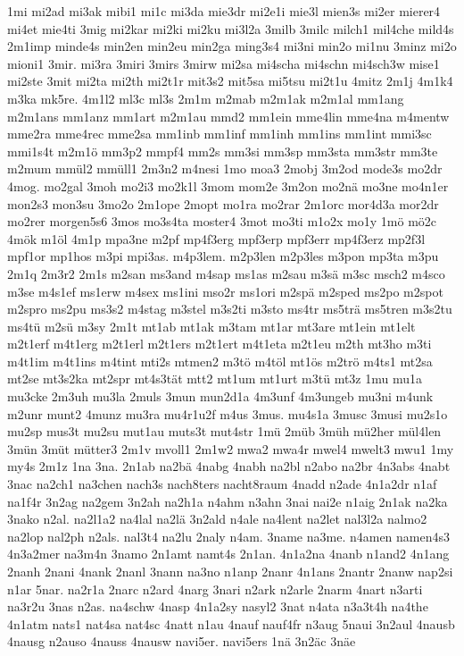{1mi
mi2ad
mi3ak
mibi1
mi1c
mi3da
mie3dr
mi2e1i
mie3l
mien3s
mi2er
mierer4
mi4et
mie4ti
3mig
mi2kar
mi2ki
mi2ku
mi3l2a
3milb
3milc
milch1
mil4che
mild4s
2m1imp
minde4s
min2en
min2eu
min2ga
ming3s4
mi3ni
min2o
mi1nu
3minz
mi2o
mioni1
3mir.
mi3ra
3miri
3mirs
3mirw
mi2sa
mi4scha
mi4schn
mi4sch3w
mise1
mi2ste
3mit
mi2ta
mi2th
mi2t1r
mit3s2
mit5sa
mi5tsu
mi2t1u
4mitz
2m1j
4m1k4
m3ka
mk5re.
4m1l2
ml3c
ml3s
2m1m
m2mab
m2m1ak
m2m1al
mm1ang
m2m1ans
mm1anz
mm1art
m2m1au
mmd2
mm1ein
mme4lin
mme4na
m4mentw
mme2ra
mme4rec
mme2sa
mm1inb
mm1inf
mm1inh
mm1ins
mm1int
mmi3sc
mmi1s4t
m2m1ö
mm3p2
mmpf4
mm2s
mm3si
mm3sp
mm3sta
mm3str
mm3te
m2mum
mmül2
mmüll1
2m3n2
m4nesi
1mo
moa3
2mobj
3m2od
mode3s
mo2dr
4mog.
mo2gal
3moh
mo2i3
mo2k1l
3mom
mom2e
3m2on
mo2nä
mo3ne
mo4n1er
mon2s3
mon3su
3mo2o
2m1ope
2mopt
mo1ra
mo2rar
2m1orc
mor4d3a
mor2dr
mo2rer
morgen5s6
3mos
mo3s4ta
moster4
3mot
mo3ti
m1o2x
mo1y
1mö
mö2c
4mök
m1öl
4m1p
mpa3ne
m2pf
mp4f3erg
mpf3erp
mpf3err
mp4f3erz
mp2f3l
mpf1or
mp1hos
m3pi
mpi3as.
m4p3lem.
m2p3len
m2p3les
m3pon
mp3ta
m3pu
2m1q
2m3r2
2m1s
m2san
ms3and
m4sap
ms1as
m2sau
m3sä
m3sc
msch2
m4sco
m3se
m4s1ef
ms1erw
m4sex
ms1ini
mso2r
ms1ori
m2spä
m2sped
ms2po
m2spot
m2spro
ms2pu
ms3s2
m4stag
m3stel
m3s2ti
m3sto
ms4tr
ms5trä
ms5tren
m3s2tu
ms4tü
m2sü
m3sy
2m1t
mt1ab
mt1ak
m3tam
mt1ar
mt3are
mt1ein
mt1elt
m2t1erf
m4t1erg
m2t1erl
m2t1ers
m2t1ert
m4t1eta
m2t1eu
m2th
mt3ho
m3ti
m4t1im
m4t1ins
m4tint
mti2s
mtmen2
m3tö
m4töl
mt1ös
m2trö
m4ts1
mt2sa
mt2se
mt3s2ka
mt2spr
mt4s3tät
mtt2
mt1um
mt1urt
m3tü
mt3z
1mu
mu1a
mu3cke
2m3uh
mu3la
2muls
3mun
mun2d1a
4m3unf
4m3ungeb
mu3ni
m4unk
m2unr
munt2
4munz
mu3ra
mu4r1u2f
m4us
3mus.
mu4s1a
3musc
3musi
mu2s1o
mu2sp
mus3t
mu2su
mut1au
muts3t
mut4str
1mü
2müb
3müh
mü2her
mül4len
3mün
3müt
mütter3
2m1v
mvoll1
2m1w2
mwa2
mwa4r
mwel4
mwelt3
mwu1
1my
my4s
2m1z
1na
3na.
2n1ab
na2bä
4nabg
4nabh
na2bl
n2abo
na2br
4n3abs
4nabt
3nac
na2ch1
na3chen
nach3s
nach8ters
nacht8raum
4nadd
n2ade
4n1a2dr
n1af
na1f4r
3n2ag
na2gem
3n2ah
na2h1a
n4ahm
n3ahn
3nai
nai2e
n1aig
2n1ak
na2ka
3nako
n2al.
na2l1a2
na4lal
na2lä
3n2ald
n4ale
na4lent
na2let
nal3l2a
nalmo2
na2lop
nal2ph
n2als.
nal3t4
na2lu
2naly
n4am.
3name
na3me.
n4amen
namen4s3
4n3a2mer
na3m4n
3namo
2n1amt
namt4s
2n1an.
4n1a2na
4nanb
n1and2
4n1ang
2nanh
2nani
4nank
2nanl
3nann
na3no
n1anp
2nanr
4n1ans
2nantr
2nanw
nap2si
n1ar
5nar.
na2r1a
2narc
n2ard
4narg
3nari
n2ark
n2arle
2narm
4nart
n3arti
na3r2u
3nas
n2as.
na4schw
4nasp
4n1a2sy
nasyl2
3nat
n4ata
n3a3t4h
na4the
4n1atm
nats1
nat4sa
nat4sc
4natt
n1au
4nauf
nauf4fr
n3aug
5naui
3n2aul
4nausb
4nausg
n2auso
4nauss
4nausw
navi5er.
navi5ers
1nä
3n2äc
3näe
}
